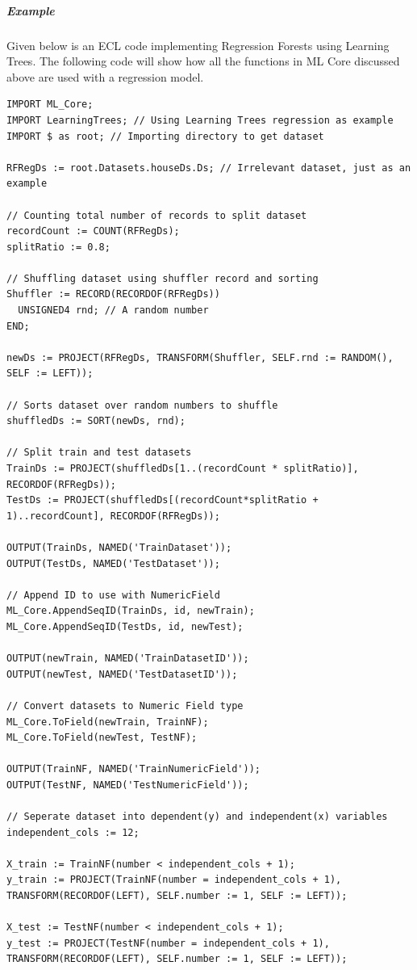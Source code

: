 \documentclass[a4paper,oneside,12pt]{book}
\begin{document}
\subparagraph{Example}\label{regression:example}

Given below is an ECL code implementing Regression Forests using Learning Trees. The following code will show how all the functions in ML Core discussed above are used with a regression model.

\begin{lstlisting}
IMPORT ML_Core;
IMPORT LearningTrees; // Using Learning Trees regression as example
IMPORT $ as root; // Importing directory to get dataset

RFRegDs := root.Datasets.houseDs.Ds; // Irrelevant dataset, just as an example

// Counting total number of records to split dataset
recordCount := COUNT(RFRegDs);
splitRatio := 0.8;

// Shuffling dataset using shuffler record and sorting
Shuffler := RECORD(RECORDOF(RFRegDs))
  UNSIGNED4 rnd; // A random number
END;

newDs := PROJECT(RFRegDs, TRANSFORM(Shuffler, SELF.rnd := RANDOM(), SELF := LEFT));

// Sorts dataset over random numbers to shuffle
shuffledDs := SORT(newDs, rnd);

// Split train and test datasets
TrainDs := PROJECT(shuffledDs[1..(recordCount * splitRatio)], RECORDOF(RFRegDs));
TestDs := PROJECT(shuffledDs[(recordCount*splitRatio + 1)..recordCount], RECORDOF(RFRegDs));

OUTPUT(TrainDs, NAMED('TrainDataset'));
OUTPUT(TestDs, NAMED('TestDataset'));

// Append ID to use with NumericField 
ML_Core.AppendSeqID(TrainDs, id, newTrain);
ML_Core.AppendSeqID(TestDs, id, newTest);

OUTPUT(newTrain, NAMED('TrainDatasetID'));
OUTPUT(newTest, NAMED('TestDatasetID'));

// Convert datasets to Numeric Field type
ML_Core.ToField(newTrain, TrainNF);
ML_Core.ToField(newTest, TestNF);

OUTPUT(TrainNF, NAMED('TrainNumericField'));
OUTPUT(TestNF, NAMED('TestNumericField'));

// Seperate dataset into dependent(y) and independent(x) variables
independent_cols := 12;

X_train := TrainNF(number < independent_cols + 1);
y_train := PROJECT(TrainNF(number = independent_cols + 1), TRANSFORM(RECORDOF(LEFT), SELF.number := 1, SELF := LEFT));

X_test := TestNF(number < independent_cols + 1);
y_test := PROJECT(TestNF(number = independent_cols + 1), TRANSFORM(RECORDOF(LEFT), SELF.number := 1, SELF := LEFT));


\end{lstlisting}
\end{document}

